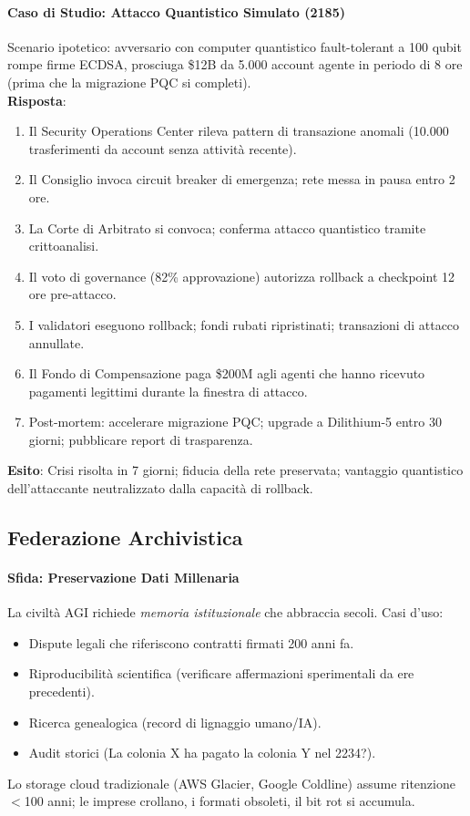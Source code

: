 \documentclass[11pt]{article}
\begin{document}
\paragraph{Caso di Studio: Attacco Quantistico Simulato (2185)}
Scenario ipotetico: avversario con computer quantistico fault-tolerant a 100 qubit rompe firme ECDSA, prosciuga \$12B da 5.000 account agente in periodo di 8 ore (prima che la migrazione PQC si completi).\\
\textbf{Risposta}:
\begin{enumerate}[noitemsep]
  \item Il Security Operations Center rileva pattern di transazione anomali (10.000 trasferimenti da account senza attività recente).
  \item Il Consiglio invoca circuit breaker di emergenza; rete messa in pausa entro 2 ore.
  \item La Corte di Arbitrato si convoca; conferma attacco quantistico tramite crittoanalisi.
  \item Il voto di governance (82\% approvazione) autorizza rollback a checkpoint 12 ore pre-attacco.
  \item I validatori eseguono rollback; fondi rubati ripristinati; transazioni di attacco annullate.
  \item Il Fondo di Compensazione paga \$200M agli agenti che hanno ricevuto pagamenti legittimi durante la finestra di attacco.
  \item Post-mortem: accelerare migrazione PQC; upgrade a Dilithium-5 entro 30 giorni; pubblicare report di trasparenza.
\end{enumerate}
\textbf{Esito}: Crisi risolta in 7 giorni; fiducia della rete preservata; vantaggio quantistico dell'attaccante neutralizzato dalla capacità di rollback.

\subsection{Federazione Archivistica}

\paragraph{Sfida: Preservazione Dati Millenaria}
La civiltà AGI richiede \emph{memoria istituzionale} che abbraccia secoli. Casi d'uso:
\begin{itemize}[noitemsep]
  \item Dispute legali che riferiscono contratti firmati 200 anni fa.
  \item Riproducibilità scientifica (verificare affermazioni sperimentali da ere precedenti).
  \item Ricerca genealogica (record di lignaggio umano/IA).
  \item Audit storici (La colonia X ha pagato la colonia Y nel 2234?).
\end{itemize}
Lo storage cloud tradizionale (AWS Glacier, Google Coldline) assume ritenzione $<$100 anni; le imprese crollano, i formati obsoleti, il bit rot si accumula.
\end{document}
